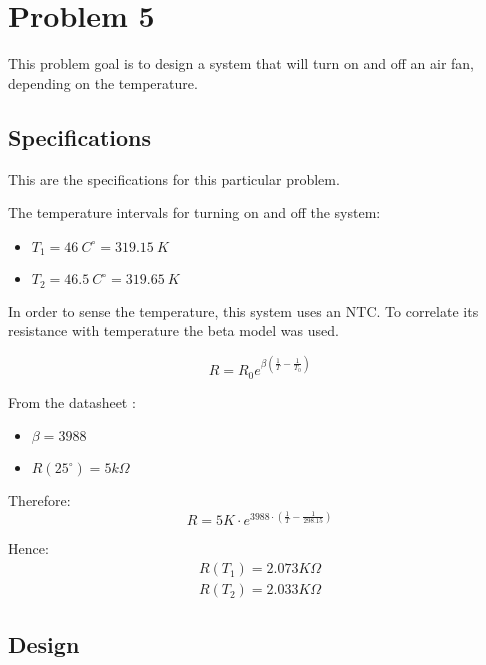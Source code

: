\section{Problem 5}

This problem goal is to design a system that will turn on and off an air fan, depending on the temperature.

\subsection{Specifications}

This are the specifications for this particular problem.

The temperature intervals for turning on and off the system:
\begin{itemize}
        
    \item $T_1 = 46~C^\circ   =  319.15 ~K$
    \item $T_2 = 46.5~C^\circ =  319.65 ~K$

\end{itemize}

In order to sense the temperature, this system uses an NTC. To correlate its resistance with temperature the beta model was used. 

\begin{equation}
    R = R_0 e^{\beta\left ( \frac{1}{T} - \frac{1}{T_0 } \right )}
\end{equation}

From the datasheet \textsuperscript{\cite{NTC_datasheet}} :

\begin{itemize}
    \item $\beta = 3988$
    \item $R(25^{\circ}) = 5k\Omega$ 
\end{itemize}

Therefore: 
\begin{equation}
    R = 5K\cdot e^{ 3988\cdot \left ( \frac{1}{T} - \frac{1}{298.15 } \right )}
\end{equation}

Hence: 
\begin{equation}
    \begin{aligned}   
        R(T_1) = 2.073 K\Omega\\
        R(T_2) = 2.033 K\Omega
    \end{aligned}
\end{equation}

\subsection{Design}
